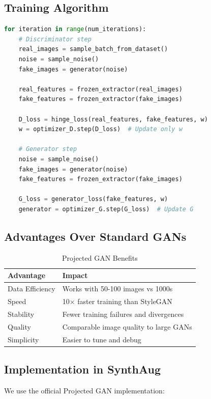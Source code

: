 \documentclass[11pt,a4paper]{article}
\begin{document}
\subsection{Training Algorithm}

\begin{lstlisting}[language=Python, caption=Projected GAN Training Loop]
for iteration in range(num_iterations):
    # Discriminator step
    real_images = sample_batch_from_dataset()
    noise = sample_noise()
    fake_images = generator(noise)
    
    real_features = frozen_extractor(real_images)
    fake_features = frozen_extractor(fake_images)
    
    D_loss = hinge_loss(real_features, fake_features, w)
    w = optimizer_D.step(D_loss)  # Update only w
    
    # Generator step
    noise = sample_noise()
    fake_images = generator(noise)
    fake_features = frozen_extractor(fake_images)
    
    G_loss = generator_loss(fake_features, w)
    generator = optimizer_G.step(G_loss)  # Update G
\end{lstlisting}

\subsection{Advantages Over Standard GANs}

\begin{table}[H]
\centering
\small
\begin{tabular}{lp{7cm}}
\toprule
\textbf{Advantage} & \textbf{Impact} \\
\midrule
Data Efficiency & Works with 50-100 images vs 1000s \\
Speed & 10× faster training than StyleGAN \\
Stability & Fewer training failures and divergences \\
Quality & Comparable image quality to large GANs \\
Simplicity & Easier to tune and debug \\
\bottomrule
\end{tabular}
\caption{Projected GAN Benefits}
\end{table}

\subsection{Implementation in SynthAug}

We use the official Projected GAN implementation:
\end{document}
